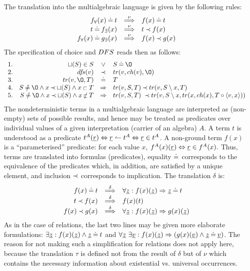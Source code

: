 The translation into the multialgebraic language is given by the following rules:
\begin{equation}\label{eq:multnu}
\begin{array}{rcl}
f_\forall(x) \mathbin{\doteq} t & \mathbin{\stackrel{\nu}{\Longrightarrow}} & f(x)\mathbin{\doteq} t\\ t \mathbin{\doteq} f_\exists(x) & \mathbin{\stackrel{\nu}{\Longrightarrow}} & t\mathbin{\prec} f(x) \\ f_\forall(x) \mathbin{\doteq} g_\exists(x) & \mathbin{\stackrel{\nu}{\Longrightarrow}} & f(x)\mathbin{\prec} g(x) \end{array}
\end{equation}
The specification of choice and $DFS$ reads then as follows: \[\begin{array}{rrcl}
1.& \ch(S) \in S & \lor & S\Eq\es \\
2.&\dfs(v) & \Incl & tr(v,ch(v),\es)\\
3. & tr(v,\es,T) & \Eq & T \\
4. & S\Not\Eq\es\land x\Incl\ch(S)\land x\lin T & \impl 
& tr(v,S,T) \Incl tr(v,S\setminus x,T) \\ 5. & S\Not\Eq\es\land x\Incl\ch(S)\land x\Not\lin T & \impl 
& tr(v,S,T)\ \Incl tr(v,S\setminus x,
tr(x,ch(x),T\ap\<v,x\> ))
\end{array} \]
The nondeterministic terms in a multialgebraic language are interpreted as (non-empty) sets
of possible results, and hence may be treated as predicates over individual values of a given interpretation (carrier of an algebra) $A$. A term $t$ is understood as a predicate $t^A(\underline{r})\mathrel{\Leftrightarrow} \underline{r}\leftharpoonup t^A\mathrel{\Leftrightarrow} \underline{r}\in t^A$.
A non-ground term $f(x)$ is a ``parameterised'' predicate: for each value $x$, $f^A(x)(\underline{r})\mathrel{\Leftrightarrow} \underline{r}\in f^A(x).$ Thus, terms are translated into formulas (predicates), equality $\mathbin{\doteq}$ corresponds to the equivalence of the predicates which, in addition, are satisfied by a unique element, and inclusion $\mathbin{\prec}$ corresponds to 
implication. The translation $\delta$ is: \begin{equation}\label{eq:multdelta}
\begin{array}{rcl}
f(x)\mathbin{\doteq} t & \mathbin{\stackrel{\delta}{\Longrightarrow}} & \forall \underline{z}: f(x)(\underline{z})\mathrel\Rightarrow \underline{z}\mathbin{\doteq} t\\ t\mathbin{\prec} f(x) & \mathbin{\stackrel{\delta}{\Longrightarrow}} & f(x)(t) \\
f(x)\mathbin{\prec} g(x) & \mathbin{\stackrel{\delta}{\Longrightarrow}} & \forall \underline{z}:f(x)(\underline{z})\mathrel\Rightarrow g(x)(\underline{z})\\ \end{array}
\end{equation}
As in the case of relations, the last two lines may be given more elaborate formulations: $\exists \underline{z}:f(x)(\underline{z})\land \underline{z}\mathbin{\doteq} t$ and $\forall\underline{z}\ \exists\underline{v}:f(x)(\underline{z})\mathrel\Rightarrow (g(x)(\underline{v})\land\underline{z}\mathbin{\doteq}\underline{v})$.
The reason for not making such a simplification for relations does not apply here, because the translation $\tau$ is defined not from the result of $\delta$  but of $\nu$  which contains the necessary information about existential vs. universal occurrences. 

